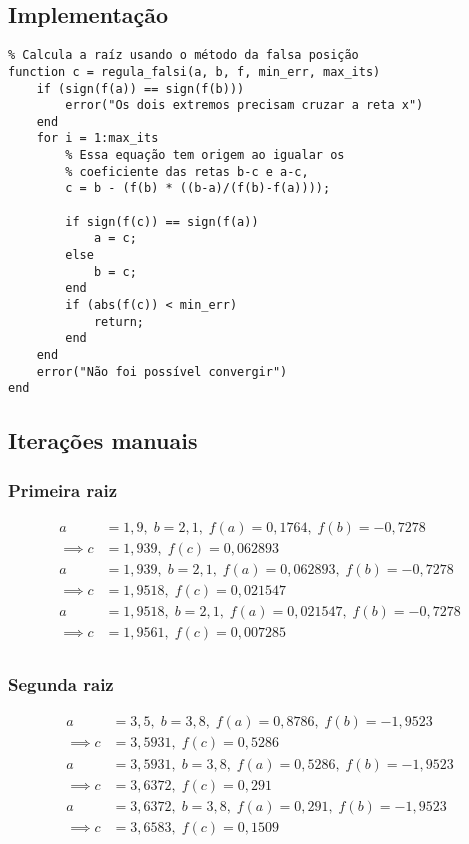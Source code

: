 \documentclass[12pt]{article}
\begin{document}
\subsection{Implementação}
\begin{verbatim}
% Calcula a raíz usando o método da falsa posição
function c = regula_falsi(a, b, f, min_err, max_its)
    if (sign(f(a)) == sign(f(b)))
        error("Os dois extremos precisam cruzar a reta x")
    end
    for i = 1:max_its
        % Essa equação tem origem ao igualar os
        % coeficiente das retas b-c e a-c,
        c = b - (f(b) * ((b-a)/(f(b)-f(a))));

        if sign(f(c)) == sign(f(a))
            a = c;
        else
            b = c;
        end
        if (abs(f(c)) < min_err)
            return;
        end
    end
    error("Não foi possível convergir")
end
\end{verbatim}
\subsection{Iterações manuais}
\subsubsection{Primeira raiz}
\begin{align*}
    a &= 1,9,\; b =2,1,\; f(a) = 0,1764,\; f(b) = -0,7278 \\
    \implies c &= 1,939,\; f(c) = 0,062893 \\
    a &= 1,939,\; b =2,1,\; f(a) = 0,062893,\; f(b) = -0,7278 \\
    \implies c &= 1,9518,\; f(c) = 0,021547 \\
    a &= 1,9518,\; b =2,1,\; f(a) = 0,021547,\; f(b) = -0,7278 \\
    \implies c &= 1,9561,\; f(c) = 0,007285 \\
\end{align*}
\subsubsection{Segunda raiz}
\begin{align*}
    a &= 3,5,\; b =3,8,\; f(a) = 0,8786,\; f(b) = -1,9523 \\
    \implies c &= 3,5931,\; f(c) = 0,5286 \\
    a &= 3,5931,\; b =3,8,\; f(a) = 0,5286,\; f(b) = -1,9523 \\
    \implies c &= 3,6372,\; f(c) = 0,291 \\
    a &= 3,6372,\; b =3,8,\; f(a) = 0,291,\; f(b) = -1,9523 \\
    \implies c &= 3,6583,\; f(c) = 0,1509 \\
\end{align*}
\end{document}
